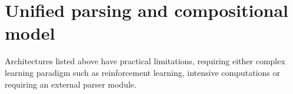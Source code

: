 

\section{Unified parsing and compositional model}

Architectures listed above  have practical limitations, requiring either complex learning paradigm such as reinforcement learning, intensive computations or requiring an external parser module.

